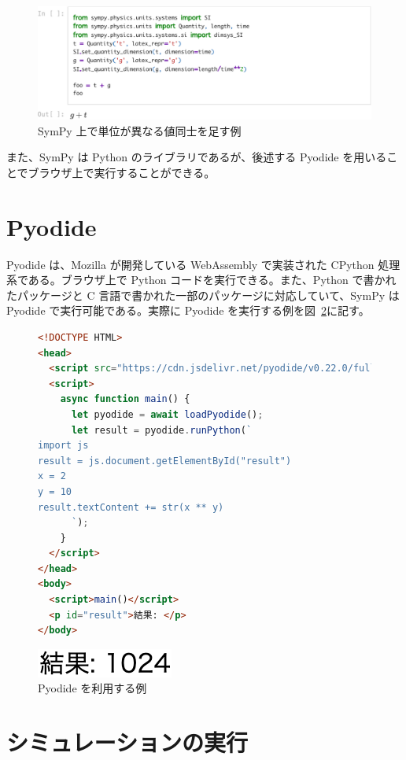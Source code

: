 \begin{figure}[t]
\centering
\includegraphics[width=\linewidth]{work/sympy_unit_example-crop.pdf}
\caption{SymPy 上で単位が異なる値同士を足す例} \label{sympy_unit_example}
\end{figure}

また、SymPy は Python のライブラリであるが、後述する Pyodide を用いることでブラウザ上で実行することができる。

\section{Pyodide}
Pyodide は、Mozilla が開発している WebAssembly で実装された CPython 処理系である。ブラウザ上で Python コードを実行できる。また、Python で書かれたパッケージと C 言語で書かれた一部のパッケージに対応していて、SymPy は Pyodide で実行可能である。実際に Pyodide を実行する例を図~\ref{pyodide_example}に記す。

\begin{figure}[h]
\centering
\begin{lstlisting}[language=HTML]
<!DOCTYPE HTML>
<head>
  <script src="https://cdn.jsdelivr.net/pyodide/v0.22.0/full/pyodide.js"></script>
  <script>
    async function main() {
      let pyodide = await loadPyodide();
      let result = pyodide.runPython(`
import js
result = js.document.getElementById("result")
x = 2
y = 10
result.textContent += str(x ** y)
      `);
    }
  </script>
</head>
<body>
  <script>main()</script>
  <p id="result">結果: </p>
</body>
\end{lstlisting}
\includegraphics*{work/pyodide_example.png}
\caption{Pyodide を利用する例} \label{pyodide_example}
\end{figure}

\section{シミュレーションの実行}

